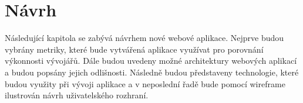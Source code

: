 \chapter{Návrh}
Následující kapitola se zabývá návrhem nové webové aplikace. Nejprve budou vybrány metriky, které bude vytvářená aplikace využívat pro porovnání výkonnosti vývojářů. Dále budou uvedeny možné architektury webových aplikací a budou popsány jejich odlišnosti. Následně budou představeny technologie, které budou využity při vývoji aplikace a v neposlední řadě bude pomocí wireframe ilustrován návrh uživatelského rozhraní.



\newpage



